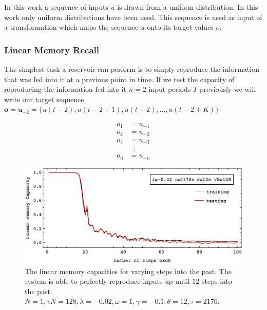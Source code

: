 In this work a sequence of inputs $u$ is drawn from a uniform distribution. In this work only uniform distributions have been used. This sequence is used as input of a transformation which maps the sequence $u$ onto its target values $o$.

\subsubsection{Linear Memory Recall}
The simplest task a reservoir can perform is to simply reproduce the information that was fed into it at a previous point in time. If we test the capacity of reproducing the information fed into it $n=2$ input periods $T$ previously we will write our target sequence $\mathbf{o} = \mathbf{u}_{-2} = \{u(t-2), u(t-2+1), u(t+2), \dots, u(t-2+K)\}$

\begin{equation}
\begin{split}
o_{1} & = u_{-1} \\
o_{2} & = u_{-2} \\				
o_{3} & = u_{-3} \\
&\;\; \vdots \\
o_{n} & = u_{-n}
\end{split}
\label{eq:linear_recall_task}
\end{equation}




\begin{figure}
	\centering
	\includegraphics[width=0.99\linewidth]{pics/linearMemoryCurveN1}
	\caption{The linear memory capacities for varying steps into the past. The system is able to perfectly reproduce inputs up until $12$ steps into the past. $N=1, vN=128, \lambda=-0.02, \omega=1, \gamma=-0.1, \theta=12, \tau=2176$. }
	\label{fig:linearMemoryRecallCurveN1}
\end{figure}

